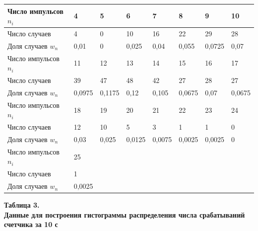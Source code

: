 \begin{table}[H]
    \centering
    \begin{tabular}{|l|l|l|l|l|l|l|l|}
        \hline
        Число импульсов $n_i$ & 4      & 5      & 6      & 7      & 8      & 9      & 10     \\ \hline
        Число случаев         & 4      & 0      & 10     & 16     & 22     & 29     & 28     \\ \hline
        Доля случаев $w_n$    & 0,01   & 0      & 0,025  & 0,04   & 0,055  & 0,0725 & 0,07   \\ \hline\hline
        Число импульсов $n_i$ & 11     & 12     & 13     & 14     & 15     & 16     & 17     \\ \hline
        Число случаев         & 39     & 47     & 48     & 42     & 27     & 28     & 27     \\ \hline
        Доля случаев $w_n$    & 0,0975 & 0,1175 & 0,12   & 0,105  & 0,0675 & 0,07   & 0,0675 \\ \hline\hline
        Число импульсов $n_i$ & 18     & 19     & 20     & 21     & 22     & 23     & 24     \\ \hline
        Число случаев         & 12     & 10     & 5      & 3      & 1      & 1      & 0      \\ \hline
        Доля случаев $w_n$    & 0,03   & 0,025  & 0,0125 & 0,0075 & 0,0025 & 0,0025 & 0      \\ \hline\hline
        Число импульсов $n_i$ & 25                                                           \\ \hline
        Число случаев         & 1                                                            \\ \hline
        Доля случаев $w_n$    & 0,0025                                                       \\ \hline
    \end{tabular}
    \begin{flushright}
        {\scriptsize \textbf{Таблица 3.}\\ \textbf {Данные для построения гистограммы распределения числа срабатываний счетчика за 10 с}}
    \end{flushright}
\end{table}


